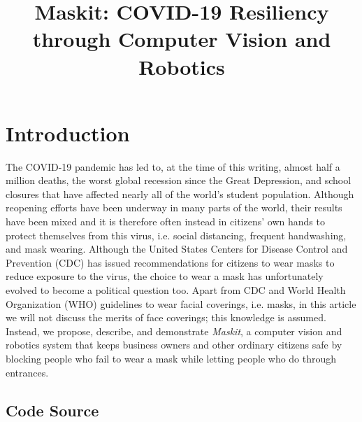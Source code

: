 \documentclass[conference, 12pt, onecolumn]{IEEEtran}
\date{}
\begin{document}
\title{Maskit: COVID-19 Resiliency through Computer Vision and Robotics}
\author{ 
\and
{}
}

\maketitle

\section{Introduction}
The COVID-19 pandemic has led to, at the time of this writing, almost half a million deaths, the worst global recession since the Great Depression, and school closures that have affected nearly all of the world's student population. Although reopening efforts have been underway in many parts of the world, their results have been mixed and it is therefore often instead in citizens' own hands to protect themselves from this virus, i.e. social distancing, frequent handwashing, and mask wearing. Although the United States Centers for Disease Control and Prevention (CDC) has issued recommendations for citizens to wear masks to reduce exposure to the virus, the choice to wear a mask has unfortunately evolved to become a political question too. Apart from CDC and World Health Organization (WHO) guidelines to wear facial coverings, i.e. masks, in this article we will not discuss the merits of face coverings; this knowledge is assumed. Instead, we propose, describe, and demonstrate \textit{Maskit}, a computer vision and robotics system that keeps business owners and other ordinary citizens safe by blocking people who fail to wear a mask while letting people who do through entrances.
\subsection{Code Source}
\end{document}
